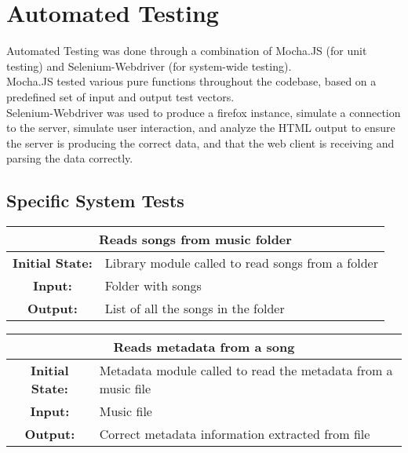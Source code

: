 \documentclass[12pt, titlepage]{article}
\begin{document}
\section{Automated Testing}

Automated Testing was done through a combination of Mocha.JS (for unit testing) and Selenium-Webdriver (for system-wide testing). \\


Mocha.JS tested various pure functions throughout the codebase, based on a predefined set of input and output test vectors. \\

Selenium-Webdriver was used to produce a firefox instance, simulate a connection to the server, simulate user interaction, and analyze the HTML output to ensure the server is producing the correct data, and that the web client is receiving and parsing the data correctly.

\subsection{Specific System Tests}


\begin{center}
\begin{table}[H]
\begin{tabularx}{\textwidth}{| c X |}
\hline
\multicolumn{2}{|c|}{\textbf{Reads songs from music folder}}\\
\hline
\textbf{Initial State: } & Library module called to read songs from a folder\\
\textbf{Input: } & Folder with songs\\
\textbf{Output: } & List of all the songs in the folder\\
\hline
\end{tabularx}
\end{table}
\end{center}


\begin{center}
\begin{table}[H]
\begin{tabularx}{\textwidth}{| c X |}
\hline
\multicolumn{2}{|c|}{\textbf{Reads metadata from a song}}\\
\hline
\textbf{Initial State: } & Metadata module called to read the metadata from a music file\\
\textbf{Input: } & Music file\\
\textbf{Output: } & Correct metadata information extracted from file\\
\hline
\end{tabularx}
\end{table}
\end{center}
\end{document}
